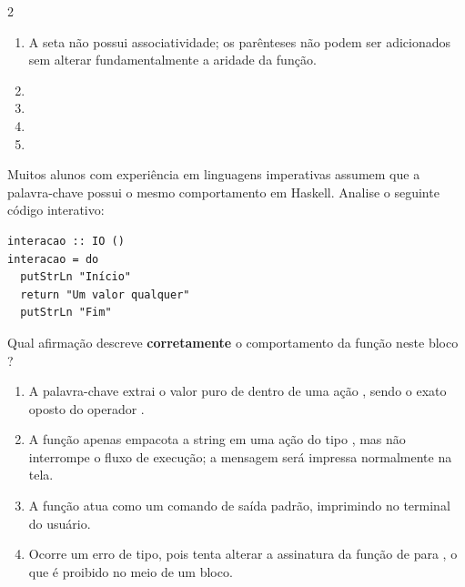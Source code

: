\documentclass[a4paper,10pt,brazil]{article}
\begin{document}
\begin{multicols}{2}
\begin{enumerate}
  \item A seta não possui associatividade; os parênteses não podem ser adicionados sem alterar fundamentalmente a aridade da função.

  \item {}

  \item {}

  \item {}

  \item {}


\end{enumerate}

Muitos alunos com experiência em linguagens imperativas assumem que a palavra-chave  possui o mesmo comportamento em Haskell. Analise o seguinte código interativo:

\begin{verbatim}
interacao :: IO ()
interacao = do
  putStrLn "Início"
  return "Um valor qualquer"
  putStrLn "Fim"
\end{verbatim}

Qual afirmação descreve \textbf{corretamente} o comportamento da função  neste bloco ?

\begin{enumerate}
  \item A palavra-chave  extrai o valor puro de dentro de uma ação , sendo o exato oposto do operador \haskellinline{<-}.

  \item A função  apenas empacota a string em uma ação do tipo , mas não interrompe o fluxo de execução; a mensagem  será impressa normalmente na tela.

  \item A função  atua como um comando de saída padrão, imprimindo  no terminal do usuário.

  \item Ocorre um erro de tipo, pois  tenta alterar a assinatura da função de  para , o que é proibido no meio de um bloco.


\end{enumerate}
\end{multicols}
\end{document}
